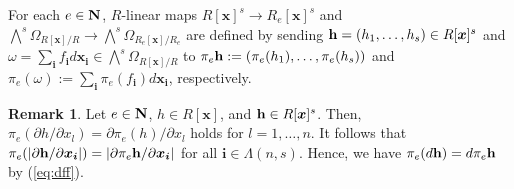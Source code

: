 \documentclass{amsart}
\theoremstyle{plain}
\theoremstyle{definition}
\newtheorem{rem}[thm]{Remark}
\newcommand{\N}{{\bf N}}
\newcommand{\x}{{\boldsymbol x}}
\newcommand{\bi}{{\boldsymbol i}}
\newcommand{\bh}{{\bf h}}
\newcommand{\Rx}{R[\x]}
\begin{document}
For each $e\in \N $, 
$R$-linear maps 
$\Rx ^s\to R_e[\x ]^s$ and 
$\bigwedge ^s\Omega _{\Rx /R}\to \bigwedge ^s\Omega _{R_e[\x ]/R_e}$ 
are defined by sending 
$\bh =(h_1,\ldots ,h_s)\in \Rx ^s$ and 
$\omega =\sum _{\bi }f_{\bi }d\x _{\bi }
\in \bigwedge ^s\Omega _{\Rx /R}$ 
to 
$\pi _e\bh :=(\pi _e(h_1),\ldots ,\pi _e(h_s))$ 
and 
$\pi _e(\omega ):=\sum _{\bi }\pi _e(f_{\bi })d\x _{\bi }$, 
respectively. 




\begin{rem}\label{rem:reduce jacobian}\rm 
Let $e\in \N $, $h\in \Rx $, 
and $\bh \in \Rx ^s$. 
Then, 
$\pi _e(\partial h/\partial x_l)=\partial \pi _e(h)/\partial x_l$ 
holds for $l=1,\ldots ,n$. 
It follows that 
$\pi _e(|\partial \bh/\partial \x _{\bi }|)
=|\partial \pi _e\bh /\partial \x _{\bi }|$ 
for all $\bi \in \Lambda (n,s)$. 
Hence, 
we have $\pi _e(d\bh)=d\pi _e\bh $ by (\ref{eq:dff}). 
\end{rem}
\end{document}
